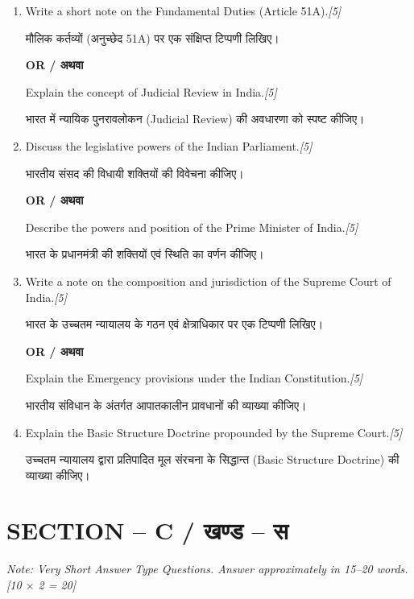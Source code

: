 \documentclass[11pt,a4paper]{article}
\newcommand{\pts}[1]{\hfill \textit{[#1]}}
\begin{document}
\begin{enumerate}[label=\textbf{\arabic*.},leftmargin=*,start=4,itemsep=10pt]

  \item Write a short note on the Fundamental Duties (Article 51A).\pts{5}
  
  मौलिक कर्तव्यों (अनुच्छेद 51A) पर एक संक्षिप्त टिप्पणी लिखिए।

  \begin{center}\textbf{OR / अथवा}\end{center}

  Explain the concept of Judicial Review in India.\pts{5}
  
  भारत में न्यायिक पुनरावलोकन (Judicial Review) की अवधारणा को स्पष्ट कीजिए।

  \item Discuss the legislative powers of the Indian Parliament.\pts{5}
  
  भारतीय संसद की विधायी शक्तियों की विवेचना कीजिए।

  \begin{center}\textbf{OR / अथवा}\end{center}

  Describe the powers and position of the Prime Minister of India.\pts{5}
  
  भारत के प्रधानमंत्री की शक्तियों एवं स्थिति का वर्णन कीजिए।

  \item Write a note on the composition and jurisdiction of the Supreme Court of India.\pts{5}
  
  भारत के उच्चतम न्यायालय के गठन एवं क्षेत्राधिकार पर एक टिप्पणी लिखिए।

  \begin{center}\textbf{OR / अथवा}\end{center}

  Explain the Emergency provisions under the Indian Constitution.\pts{5}
  
  भारतीय संविधान के अंतर्गत आपातकालीन प्रावधानों की व्याख्या कीजिए।

  \item Explain the Basic Structure Doctrine propounded by the Supreme Court.\pts{5}
  
  उच्चतम न्यायालय द्वारा प्रतिपादित मूल संरचना के सिद्धान्त (Basic Structure Doctrine) की व्याख्या कीजिए।

\end{enumerate}

\bigskip

\section*{SECTION -- C / खण्ड -- स}
\noindent \textit{Note: Very Short Answer Type Questions. Answer approximately in 15--20 words.}\pts{10 $\times$ 2 = 20}
\end{document}
